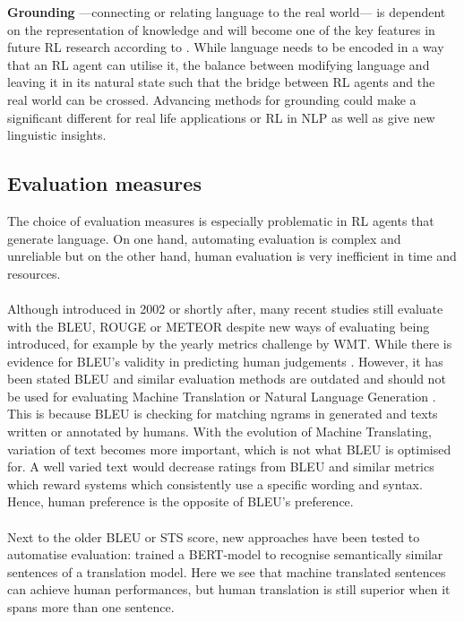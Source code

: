 \documentclass[11pt,a4paper]{article}
\begin{document}
\textbf{Grounding} ---connecting or relating language to the real world--- is dependent on the representation of knowledge and will become one of the key features in future RL research according to \citet{narasimhan-2018}. While language needs to be encoded in a way that an RL agent can utilise it, the balance between modifying language and leaving it in its natural state such that the bridge between RL agents and the real world can be crossed. Advancing methods for grounding could make a significant different for real life applications or RL in NLP as well as give new linguistic insights.

\subsection{Evaluation measures}
The choice of evaluation measures is especially problematic in RL agents that generate language. On one hand, automating evaluation is complex and unreliable but on the other hand, human evaluation is very inefficient in time and resources. \\\\
Although introduced in 2002 or shortly after, many recent studies still evaluate with the BLEU, ROUGE or METEOR \citep{papineni-etal-2002-bleu,lin-2004-rouge, banerjee-lavie-2005-meteor} despite new ways of evaluating being introduced, for example by the yearly metrics challenge by WMT. While there is evidence for BLEU's validity in predicting human judgements \citep{reiter-2018-astructured}. However, it has been stated BLEU and similar evaluation methods are outdated and should not be used for evaluating Machine Translation or Natural Language Generation \citep{reiter_2020_small, reiter_2020_why, reiter-2018-astructured, mathur-etal-2020-tangled}. This is because BLEU is checking for matching ngrams in generated and texts written or annotated by humans. With the evolution of Machine Translating, variation of text becomes more important, which is not what BLEU is optimised for. A well varied text would decrease ratings from BLEU and similar metrics which reward systems which consistently use a specific wording and syntax. Hence, human preference is the opposite of BLEU's preference.\\\\
Next to the older BLEU or STS score, new approaches have been tested to automatise evaluation: \citet{yasui-etal-2019} trained a BERT-model to recognise semantically similar sentences of a translation model. Here we see that machine translated sentences can achieve human performances, but human translation is still superior when it spans more than one sentence. \\\\ 
\end{document}
